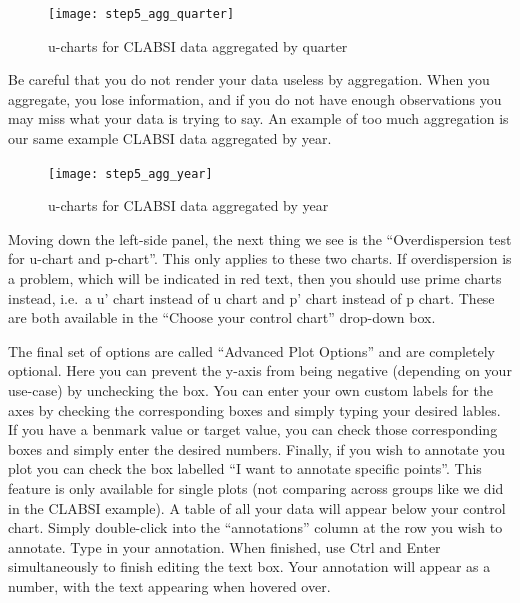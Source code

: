 \documentclass[12pt,openany]{book}
\numberwithin{dummy}{section}
\theoremstyle{ocrenumbox}
\theoremstyle{ocrenumb}
\theoremstyle{blacknumex}
\theoremstyle{blacknumbox}
\theoremstyle{ocrenum}
\newlength\esp
\begin{document}
\begin{figure}

{\centering \texttt{[image: step5\_agg\_quarter]} 

}

\caption{u-charts for CLABSI data aggregated by quarter}\label{fig:unnamed-chunk-5}
\end{figure}

Be careful that you do not render your data useless by aggregation. When you aggregate, you lose information, and if you do not have enough observations you may miss what your data is trying to say. An example of too much aggregation is our same example CLABSI data aggregated by year.

\begin{figure}

{\centering \texttt{[image: step5\_agg\_year]} 

}

\caption{u-charts for CLABSI data aggregated by year}\label{fig:unnamed-chunk-6}
\end{figure}

Moving down the left-side panel, the next thing we see is the ``Overdispersion test for u-chart and p-chart''. This only applies to these two charts. If overdispersion is a problem, which will be indicated in red text, then you should use prime charts instead, i.e.~a u' chart instead of u chart and p' chart instead of p chart. These are both available in the ``Choose your control chart'' drop-down box.

The final set of options are called ``Advanced Plot Options'' and are completely optional. Here you can prevent the y-axis from being negative (depending on your use-case) by unchecking the box. You can enter your own custom labels for the axes by checking the corresponding boxes and simply typing your desired lables. If you have a benmark value or target value, you can check those corresponding boxes and simply enter the desired numbers. Finally, if you wish to annotate you plot you can check the box labelled ``I want to annotate specific points''. This feature is only available for single plots (not comparing across groups like we did in the CLABSI example). A table of all your data will appear below your control chart. Simply double-click into the ``annotations'' column at the row you wish to annotate. Type in your annotation. When finished, use Ctrl and Enter simultaneously to finish editing the text box. Your annotation will appear as a number, with the text appearing when hovered over.
\end{document}
